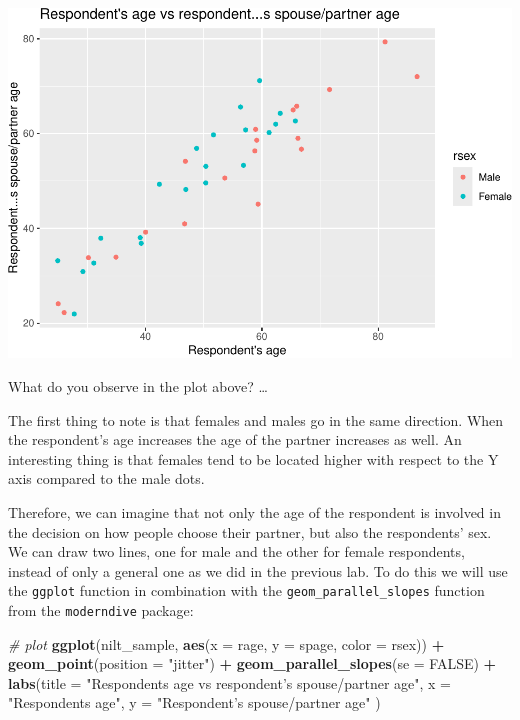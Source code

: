 \documentclass[
]{book}
\newenvironment{Shaded}{\begin{snugshade}}{\end{snugshade}}
\newcommand{\AttributeTok}[1]{\textcolor[rgb]{0.13,0.29,0.53}{#1}}
\newcommand{\CommentTok}[1]{\textcolor[rgb]{0.56,0.35,0.01}{\textit{#1}}}
\newcommand{\ConstantTok}[1]{\textcolor[rgb]{0.56,0.35,0.01}{#1}}
\newcommand{\FunctionTok}[1]{\textcolor[rgb]{0.13,0.29,0.53}{\textbf{#1}}}
\newcommand{\NormalTok}[1]{#1}
\newcommand{\SpecialCharTok}[1]{\textcolor[rgb]{0.81,0.36,0.00}{\textbf{#1}}}
\newcommand{\StringTok}[1]{\textcolor[rgb]{0.31,0.60,0.02}{#1}}
\begin{document}
\begin{flushleft}\includegraphics[width=1\linewidth]{lab-workbook_files/figure-latex/unnamed-chunk-102-1} \end{flushleft}

What do you observe in the plot above? \ldots{}

The first thing to note is that females and males go in the same direction. When the respondent's age increases the age of the partner increases as well. An interesting thing is that females tend to be located higher with respect to the Y axis compared to the male dots.

Therefore, we can imagine that not only the age of the respondent is involved in the decision on how people choose their partner, but also the respondents' sex. We can draw two lines, one for male and the other for female respondents, instead of only a general one as we did in the previous lab. To do this we will use the \texttt{ggplot} function in combination with the \texttt{geom\_parallel\_slopes} function from the \texttt{moderndive} package:

\begin{Shaded}
\begin{Highlighting}[]
\CommentTok{\# plot}
\FunctionTok{ggplot}\NormalTok{(nilt\_sample,  }\FunctionTok{aes}\NormalTok{(}\AttributeTok{x =}\NormalTok{ rage, }\AttributeTok{y =}\NormalTok{ spage, }\AttributeTok{color =}\NormalTok{ rsex)) }\SpecialCharTok{+} 
  \FunctionTok{geom\_point}\NormalTok{(}\AttributeTok{position =} \StringTok{"jitter"}\NormalTok{) }\SpecialCharTok{+}
  \FunctionTok{geom\_parallel\_slopes}\NormalTok{(}\AttributeTok{se =} \ConstantTok{FALSE}\NormalTok{) }\SpecialCharTok{+}
  \FunctionTok{labs}\NormalTok{(}\AttributeTok{title =} \StringTok{"Respondent\textquotesingle{}s age vs respondent’s spouse/partner age"}\NormalTok{, }
       \AttributeTok{x =} \StringTok{"Respondent\textquotesingle{}s age"}\NormalTok{, }\AttributeTok{y =} \StringTok{"Respondent’s spouse/partner age"}\NormalTok{ )}
\end{Highlighting}
\end{Shaded}
\end{document}
